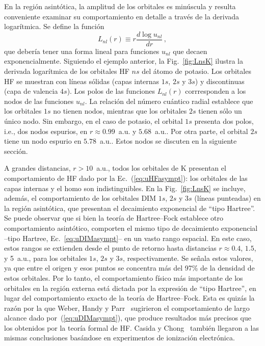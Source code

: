 En la región asintótica, la amplitud de los orbitales es minúscula y 
resulta conveniente examinar su comportamiento en detalle a través de la 
derivada logarítmica. Se define la función
\begin{equation}
L_{nl}(r) \equiv r \frac{d \log{u_{nl}}}{d r}\,,
\label{eq:Lnl}
\end{equation}
que debería tener una forma lineal para funciones $u_{nl}$ que decaen 
exponencialmente. Siguiendo el ejemplo anterior, la Fig.~\ref{fig:LnsK} 
ilustra la derivada logarítmica de los orbitales HF $ns$ del átomo de 
potasio. Los orbitales HF se muestran con líneas sólidas (capas internas 
$1s$, $2s$ y $3s$) y discontinuas (capa de valencia $4s$). Los polos de 
las funciones $L_{nl}(r)$ corrresponden a los nodos de las funciones 
$u_{nl}$. La relación del número cuántico radial establece que los 
orbitales $1s$ no tienen nodos, mientras que los orbitales $2s$ tienen 
sólo un único nodo. Sin embargo, en el caso de potasio, el orbital $1s$ 
presenta dos polos, i.e., dos nodos espurios, en $r\approx 0.99$~a.u. y 
$5.68$~a.u.. Por otra parte, el orbital $2s$ tiene un nodo espurio en 
$5.78$~a.u.. Estos nodos se discuten en la siguiente sección.

A grandes distancias, $r>10$~a.u., todos los orbitales de K presentan el 
comportamiento de HF dado por la Ec.~(\ref{eq:uHFasympt}): los orbitales 
de las capas internas y el \acs{homo} son indistinguibles. En la 
Fig.~\ref{fig:LnsK} se incluye, además, el comportamiento de los 
orbitales DIM $1s$, $2s$ y $3s$ (líneas punteadas) en la región 
asintótica, que presentan el decaimiento exponencial de ``tipo 
Hartree''. Se puede observar que si bien la teoría de Hartree--Fock 
establece otro comportamiento asintótico, comporten el mismo tipo de 
decaimiento exponencial --tipo Hartree, Ec.~\ref{eq:uDIMasympt}-- en un 
vasto rango espacial. En este caso, estos rangos se extienden desde el 
punto de retorno hasta distancias $r\approx 0.4$, $1.5$, y 5~a.u., para 
los orbitales $1s$, $2s$ y $3s$, respectivamente. Se señala estos 
valores, ya que entre el origen y esos puntos se concentra más del 97\% 
de la densidad de estos orbitales. Por lo tanto, el 
comportamiento físico más importante de los orbitales en la región 
externa está dictada por la expresión de ``tipo Hartree'', en lugar del 
comportamiento exacto de la teoría de Hartree--Fock. Esta es quizás la 
razón por la que Weber, Handy y Parr~\cite{Weber:70} sugirieron 
el comportamiento de largo alcance dado por~(\ref{eq:uDIMasympt}), 
que produce resultados más precisos que los obtenidos por la teoría 
formal de HF. Casida y Chong~\cite{Casida:89} también llegaron a las 
mismas conclusiones basándose en experimentos de ionización electrónica. 

